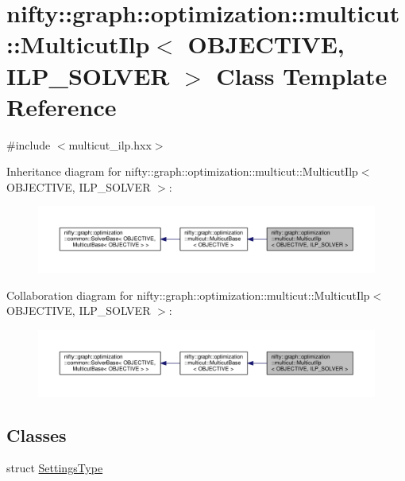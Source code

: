 \hypertarget{classnifty_1_1graph_1_1optimization_1_1multicut_1_1MulticutIlp}{}\section{nifty\+:\+:graph\+:\+:optimization\+:\+:multicut\+:\+:Multicut\+Ilp$<$ O\+B\+J\+E\+C\+T\+I\+V\+E, I\+L\+P\+\_\+\+S\+O\+L\+V\+E\+R $>$ Class Template Reference}
\label{classnifty_1_1graph_1_1optimization_1_1multicut_1_1MulticutIlp}


{\ttfamily \#include $<$multicut\+\_\+ilp.\+hxx$>$}



Inheritance diagram for nifty\+:\+:graph\+:\+:optimization\+:\+:multicut\+:\+:Multicut\+Ilp$<$ O\+B\+J\+E\+C\+T\+I\+V\+E, I\+L\+P\+\_\+\+S\+O\+L\+V\+E\+R $>$\+:\nopagebreak
\begin{figure}[H]
\begin{center}
\leavevmode
\includegraphics[width=350pt]{classnifty_1_1graph_1_1optimization_1_1multicut_1_1MulticutIlp__inherit__graph}
\end{center}
\end{figure}


Collaboration diagram for nifty\+:\+:graph\+:\+:optimization\+:\+:multicut\+:\+:Multicut\+Ilp$<$ O\+B\+J\+E\+C\+T\+I\+V\+E, I\+L\+P\+\_\+\+S\+O\+L\+V\+E\+R $>$\+:\nopagebreak
\begin{figure}[H]
\begin{center}
\leavevmode
\includegraphics[width=350pt]{classnifty_1_1graph_1_1optimization_1_1multicut_1_1MulticutIlp__coll__graph}
\end{center}
\end{figure}
\subsection*{Classes}
\begin{DoxyCompactItemize}
\item 
struct \hyperlink{structnifty_1_1graph_1_1optimization_1_1multicut_1_1MulticutIlp_1_1SettingsType}{Settings\+Type}
\end{DoxyCompactItemize}
